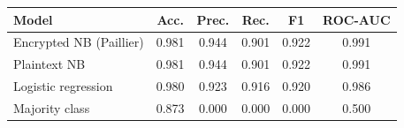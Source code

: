 \begin{tabular}{@{}lccccc@{}}
\toprule
Model & Acc. & Prec. & Rec. & F1 & ROC-AUC \\
\midrule
Encrypted NB (Paillier) & 0.981 & 0.944 & 0.901 & 0.922 & 0.991 \\
Plaintext NB & 0.981 & 0.944 & 0.901 & 0.922 & 0.991 \\
Logistic regression & 0.980 & 0.923 & 0.916 & 0.920 & 0.986 \\
Majority class & 0.873 & 0.000 & 0.000 & 0.000 & 0.500 \\
\bottomrule
\end{tabular}
